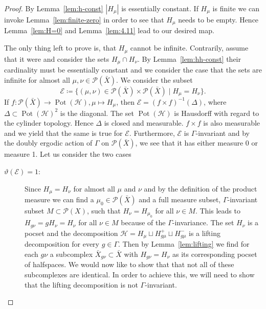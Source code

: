 \begin{proof}
  By Lemma~\ref{lem:h-const} \(|H_\mu|\) is essentially constant.
  If \(H_\mu\) is finite we can invoke Lemma~\ref{lem:finite-zero} in order to see that \(H_\mu\) needs to be empty. Hence Lemma~\ref{lem:H=0} and Lemma~\ref{lem:4.11} lead to our desired map.

  The only thing left to prove is, that \(H_\mu\) cannot be infinite. Contrarily, assume that it were and consider the sets \(H_\mu \cap H_\nu\). By Lemma~\ref{lem:hh-const} their cardinality must be essentially constant and we consider the case that the sets are infinite for almost all \(\mu, \nu \in \mathcal{P}(\bar X)\).
  We consider the subset
  \[
    \mathcal{E} \coloneqq \{(\mu, \nu) \in \mathcal{P}(\bar X) \times \mathcal{P}(\bar X)\mid H_\mu = H_\nu\}.
  \]
  If \(f\colon \mathcal{P}(\bar X) \to \operatorname{Pot}(\mathcal{H}), \mu \mapsto H_\mu\), then \(\mathcal{E} = (f \times f)^{-1}(\Delta)\), where \(\Delta \subset \operatorname{Pot}(\mathcal{H})^2\) is the diagonal. The set \(\operatorname{Pot}(\mathcal{H})\) is Hausdorff with regard to the cylinder topology. Hence \(\Delta\) is closed and measurable. \(f \times f\) is also measurable and we yield that the same is true for \(\mathcal{E}\). Furthermore, \(\mathcal{E}\) is \(\Gamma\)-invariant and by the doubly ergodic action of \(\Gamma\) on \(\mathcal{P}(\bar X)\), we see that it has either measure 0 or measure 1. Let us consider the two cases
  \begin{description}
  \item[\(\vartheta(\mathcal{E})=1\):] Since \(H_\mu = H_\nu\) for almost all \(\mu\) and \(\nu\) and by the definition of the product measure we can find a \(\mu_0 \in \mathcal{P}(\bar X)\) and a full measure subset, \(\Gamma\)-invariant subset \(M \subset \mathcal{P}(X)\), such that \(H_\nu = H_{\mu_0}\) for all \(\nu \in M\). This leads to \(H_{g\nu} = gH_\nu = H_\nu\) for all \(\nu \in M\) because of the \(\Gamma\)-invariance. The set \(H_\nu\) is a pocset and the decomposition \(\mathcal{H} = H_\mu \sqcup H_{g\mu}^+ \sqcup H_{g\mu}^-\) is a lifting decomposition for every \(g \in \Gamma\). Then by Lemma~\ref{lem:lifting} we find for each \(g\nu\) a subcomplex \(\bar X_{g\nu} \subset \bar X\) with \(H_{g\nu} = H_\nu\) as its corresponding pocset of halfspaces. We would now like to show that that not all of these subcomplexes are identical. In order to achieve this, we will need to show that the lifting decomposition is not \(\Gamma\)-invariant.

\end{description}
\end{proof}
